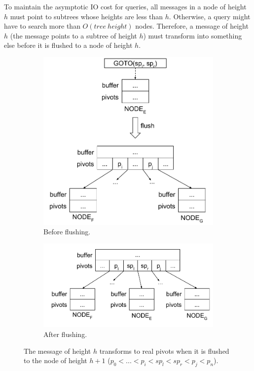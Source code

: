 To maintain the asymptotic IO cost for queries, all \GOTO messages in a node of
height $h$ must point to subtrees whose heights are less than $h$.
Otherwise, a query might have to search more than $O(tree\ height)$ nodes.
Therefore, a \GOTO message of height $h$ (the \GOTO message points to a subtree
of height $h$) must transform into something else before it is flushed to a node
of height $h$.

\begin{figure}
  \begin{subfigure}[b]{.45\textwidth}
  \centering
  \includegraphics[width=.9\linewidth]{fig/flush-1}
  \caption{Before flushing.}
  \label{subfig:flush-1}
  \end{subfigure}
  \begin{subfigure}[b]{.45\textwidth}
  \centering
  \includegraphics[width=.9\linewidth]{fig/flush-2}
  \caption{After flushing.}
  \label{subfig:flush-2}
  \end{subfigure}
  \caption{The \GOTO message of height $h$ transforms to real pivots
           when it is flushed to the node of height $h+1$
           ($p_0 < ... < p_i < sp_l < sp_r < p_j < p_n$).}
  \label{fig:flush}
\end{figure}

